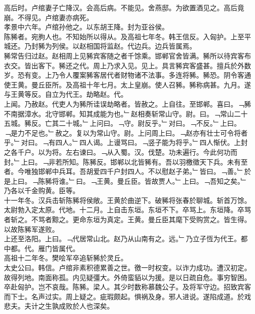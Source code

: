 \documentclass{zhvt-classic}
\begin{document}
\hspace*{2em}高后时。卢绾妻子亡降汉。会高后病。不能见。舍燕邸。为欲置酒见之。高后竟崩。不得见。卢绾妻亦病死。\\
\hspace*{2em}孝景中六年。卢绾孙他之。以东胡王降。封为亚谷侯。\\
\hspace*{2em}陈豨者。宛朐人也。不知始所以得从。及高祖七年冬。韩王信反。入匈护。上至平城还。乃封豨为列侯。以赵相国将监赵。代边兵。边兵皆属焉。\\
\hspace*{2em}豨常告归过赵。赵相周上见豨宾客随之者千馀乘。邯郸官舍皆满。豨所以待宾客布衣交。皆出客下。豨还之代。周上乃求入见。见上。具言豨宾客盛甚。擅兵於外数岁。恐有变。上乃令人覆案豨客居代者财物诸不法事。多连将豨。豨恐。阴令客通使王黄。曼丘臣所。及高祖十年七月。太上皇崩。使人召豨。豨称病甚。九月。遂与王黄等反。自立为代王。劫略赵。代。\\
\hspace*{2em}上闻。乃赦赵。代吏人为豨所诖误劫略者。皆赦之。上自往。至邯郸。喜曰。﹁豨不南据漳水。北守邯郸。知其成能为也。﹂赵相奏斩常山守。尉。曰。﹁常山二十五城。豨反。亡其二十城。﹂上问曰。﹁守。尉反乎。﹂对曰。﹁不反。﹂上曰。﹁是力不足也。﹂赦之。复以为常山守。尉。上问周上曰。﹁赵亦有壮士可令将者乎。﹂对曰。﹁有四人。﹂四人谒。上谩骂曰。﹁竖子能为将乎。﹂四人惭伏。上封之各千户。以为将。左右谏曰。﹁从入蜀。汉。伐楚。功未遍行。今此何功而封。﹂上曰。﹁非若所知。陈豨反。邯郸以北皆豨有。吾以羽檄徵天下兵。未有至者。今唯独邯郸中兵耳。吾胡爱四千户封四人。不以慰赵子弟。﹂皆曰。﹁善。﹂於是上曰。﹁陈豨将谁。﹂曰。﹁王黄。曼丘臣。皆故贾人。﹂上曰。﹁吾知之矣。﹂乃各以千金购黄。臣等。\\
\hspace*{2em}十一年冬。汉兵击斩陈豨将侯敞。王黄於曲逆下。破豨将张春於聊城。斩首万馀。太尉勃入定太原。代地。十二月。上自击东垣。东垣不下。卒骂上。东垣降。卒骂者斩之。不骂者黥之。更命东垣为真定。王黄。曼丘臣其麾下受购赏之。皆生得。以故陈豨军遂败。\\
\hspace*{2em}上还至洛阳。上曰。﹁代居常山北。赵乃从山南有之。远。﹂乃立子恆为代王。都中都。代。雁门皆属代。\\
\hspace*{2em}高祖十二年冬。樊哙军卒追斩豨於灵丘。\\
\hspace*{2em}太史公曰。韩信。卢绾非素积德累善之世。徼一时权变。以诈力成功。遭汉初定。故得列地。南面称孤。内见疑彊大。外倚蛮貊以为援。是以日疏自危。事穷智困。卒赴匈护。岂不哀哉。陈豨。梁人。其少时数称慕魏公子。及将军守边。招致宾客而下士。名声过实。周上疑之。疵瑕颇起。惧祸及身。邪人进说。遂陷成道。於戏悲夫。夫计之生孰成败於人也深矣。\\
\end{document}
